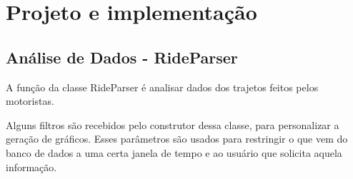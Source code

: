     







\section{Projeto e implementação}

   

    \subsection{Análise de Dados - RideParser}\label{rideparser}

    A função da classe RideParser é analisar dados dos trajetos feitos pelos motoristas. 
    
    Alguns filtros são recebidos pelo construtor dessa classe, para personalizar a geração de gráficos. Esses parâmetros são usados para restringir o que vem do banco de dados a uma certa janela de tempo e ao usuário que solicita aquela informação.
    
